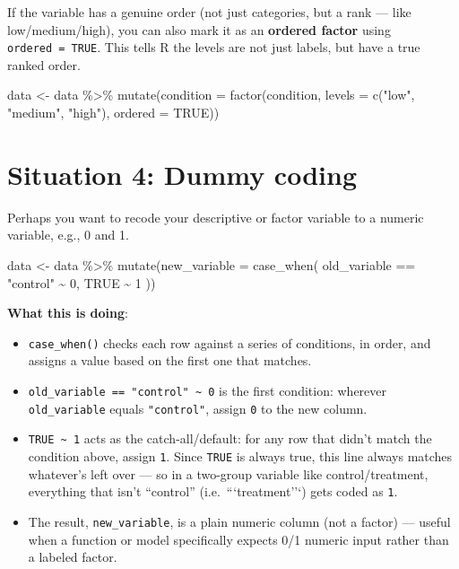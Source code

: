 \documentclass[
  letterpaper,
  DIV=11,
  numbers=noendperiod]{scrreprt}
\newenvironment{Shaded}{\begin{snugshade}}{\end{snugshade}}
\newcommand{\AttributeTok}[1]{\textcolor[rgb]{0.40,0.45,0.13}{#1}}
\newcommand{\ConstantTok}[1]{\textcolor[rgb]{0.56,0.35,0.01}{#1}}
\newcommand{\DecValTok}[1]{\textcolor[rgb]{0.68,0.00,0.00}{#1}}
\newcommand{\FunctionTok}[1]{\textcolor[rgb]{0.28,0.35,0.67}{#1}}
\newcommand{\NormalTok}[1]{\textcolor[rgb]{0.00,0.23,0.31}{#1}}
\newcommand{\OtherTok}[1]{\textcolor[rgb]{0.00,0.23,0.31}{#1}}
\newcommand{\SpecialCharTok}[1]{\textcolor[rgb]{0.37,0.37,0.37}{#1}}
\newcommand{\StringTok}[1]{\textcolor[rgb]{0.13,0.47,0.30}{#1}}
\begin{document}
If the variable has a genuine order (not just categories, but a rank ---
like low/medium/high), you can also mark it as an \textbf{ordered
factor} using \texttt{ordered\ =\ TRUE}. This tells R the levels are not
just labels, but have a true ranked order.

\begin{Shaded}
\begin{Highlighting}[]
\NormalTok{data }\OtherTok{\textless{}{-}}\NormalTok{ data }\SpecialCharTok{\%\textgreater{}\%}
  \FunctionTok{mutate}\NormalTok{(}\AttributeTok{condition =} \FunctionTok{factor}\NormalTok{(condition, }\AttributeTok{levels =} \FunctionTok{c}\NormalTok{(}\StringTok{"low"}\NormalTok{, }\StringTok{"medium"}\NormalTok{, }\StringTok{"high"}\NormalTok{), }\AttributeTok{ordered =} \ConstantTok{TRUE}\NormalTok{))}
\end{Highlighting}
\end{Shaded}

\section{Situation 4: Dummy coding}\label{situation-4-dummy-coding}

Perhaps you want to recode your descriptive or factor variable to a
numeric variable, e.g., 0 and 1.

\begin{Shaded}
\begin{Highlighting}[]
\NormalTok{data }\OtherTok{\textless{}{-}}\NormalTok{ data }\SpecialCharTok{\%\textgreater{}\%}
  \FunctionTok{mutate}\NormalTok{(}\AttributeTok{new\_variable =} \FunctionTok{case\_when}\NormalTok{(}
\NormalTok{    old\_variable }\SpecialCharTok{==} \StringTok{"control"} \SpecialCharTok{\textasciitilde{}} \DecValTok{0}\NormalTok{,}
    \ConstantTok{TRUE} \SpecialCharTok{\textasciitilde{}} \DecValTok{1}
\NormalTok{  ))}
\end{Highlighting}
\end{Shaded}

\textbf{What this is doing}:

\begin{itemize}
\item
  \texttt{case\_when()} checks each row against a series of conditions,
  in order, and assigns a value based on the first one that matches.
\item
  \texttt{old\_variable\ ==\ "control"\ \textasciitilde{}\ 0} is the
  first condition: wherever \texttt{old\_variable} equals
  \texttt{"control"}, assign \texttt{0} to the new column.
\item
  \texttt{TRUE\ \textasciitilde{}\ 1} acts as the catch-all/default: for
  any row that didn't match the condition above, assign \texttt{1}.
  Since \texttt{TRUE} is always true, this line always matches
  whatever's left over --- so in a two-group variable like
  control/treatment, everything that isn't ``control''
  (i.e.~```treatment''`) gets coded as \texttt{1}.
\item
  The result, \texttt{new\_variable}, is a plain numeric column (not a
  factor) --- useful when a function or model specifically expects 0/1
  numeric input rather than a labeled factor.
\end{itemize}
\end{document}
